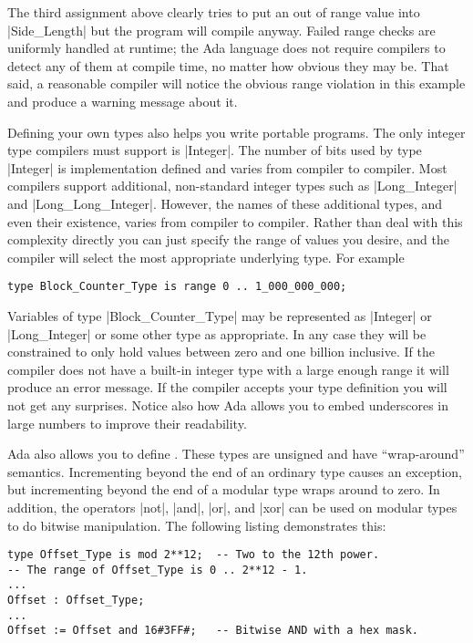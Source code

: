 The third assignment above clearly tries to put an out of range value into |Side_Length| but the
program will compile anyway. Failed range checks are uniformly handled at runtime; the Ada
language does not require compilers to detect any of them at compile time, no matter how obvious
they may be. That said, a reasonable compiler will notice the obvious range violation in this
example and produce a warning message about it.

Defining your own types also helps you write portable programs. The only integer type compilers
must support is |Integer|. The number of bits used by type |Integer| is implementation defined
and varies from compiler to compiler. Most compilers support additional, non-standard integer
types such as |Long_Integer| and |Long_Long_Integer|. However, the names of these additional
types, and even their existence, varies from compiler to compiler. Rather than deal with this
complexity directly you can just specify the range of values you desire, and the compiler will
select the most appropriate underlying type. For example

\begin{lstlisting}
type Block_Counter_Type is range 0 .. 1_000_000_000;
\end{lstlisting}

Variables of type |Block_Counter_Type| may be represented as |Integer| or |Long_Integer| or some
other type as appropriate. In any case they will be constrained to only hold values between zero
and one billion inclusive. If the compiler does not have a built-in integer type with a large
enough range it will produce an error message. If the compiler accepts your type definition you
will not get any surprises. Notice also how Ada allows you to embed underscores in large numbers
to improve their readability.

Ada also allows you to define . These types are unsigned and have
``wrap-around'' semantics. Incrementing beyond the end of an ordinary type causes an exception,
but incrementing beyond the end of a modular type wraps around to zero. In addition, the
operators |not|, |and|, |or|, and |xor| can be used on modular types to do bitwise manipulation.
The following listing demonstrates this:

\begin{lstlisting}
type Offset_Type is mod 2**12;  -- Two to the 12th power.
-- The range of Offset_Type is 0 .. 2**12 - 1.
...
Offset : Offset_Type;
...
Offset := Offset and 16#3FF#;   -- Bitwise AND with a hex mask.
\end{lstlisting}

